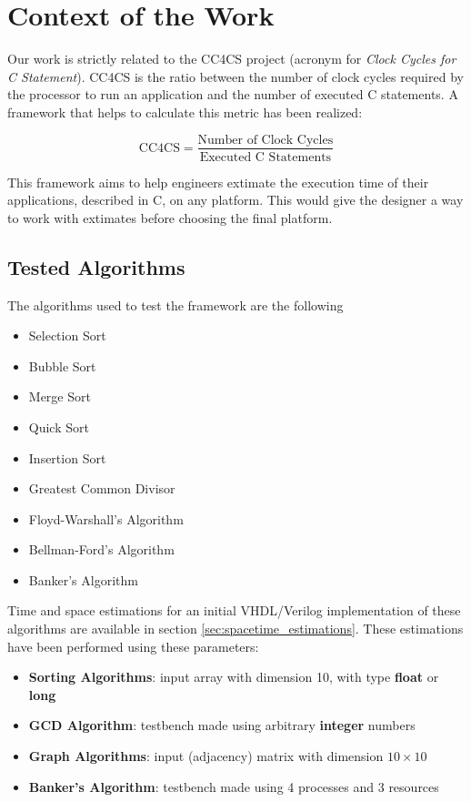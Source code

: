 \section{Context of the Work}
Our work is strictly related to the CC4CS project\cite{cc4cs_git} (acronym for \textit{Clock Cycles for C Statement}). CC4CS is the ratio between the number of clock cycles required by the processor to run an application and the number of executed C statements. A framework that helps to calculate this metric has been realized:

\[
\text{CC4CS} = \frac{\text{Number of Clock Cycles}}{\text{Executed C Statements}}
\]

This framework aims to help engineers extimate the execution time of their applications, described in C, on any platform. This would give the designer a way to work with extimates before choosing the final platform.

\subsection{Tested Algorithms}
\label{tested-algo}

The algorithms used to test the framework are the following

\begin{itemize}[noitemsep]
	\item Selection Sort
	\item Bubble Sort
	\item Merge Sort
	\item Quick Sort
	\item Insertion Sort
	\item Greatest Common Divisor
	\item Floyd-Warshall's Algorithm
	\item Bellman-Ford's Algorithm
	\item Banker's Algorithm

\end{itemize}

Time and space estimations for an initial VHDL/Verilog implementation of these algorithms are available in section \ref{sec:spacetime_estimations}. These estimations have been performed using these parameters:

\begin{itemize}[noitemsep]
	\item \textbf{Sorting Algorithms}: input array with dimension 10, with type \textbf{float} or \textbf{long}
	\item \textbf{GCD Algorithm}: testbench made using arbitrary \textbf{integer} numbers
	\item \textbf{Graph Algorithms}: input (adjacency) matrix with dimension $10\times10$
	\item \textbf{Banker's Algorithm}: testbench made using 4 processes and 3 resources

\end{itemize}